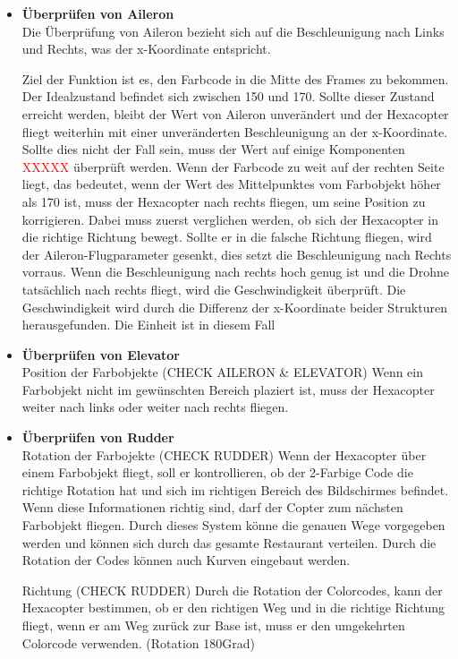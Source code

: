       \begin{itemize}
        \item \textbf{Überprüfen von Aileron}\\
        Die Überprüfung von Aileron bezieht sich auf die Beschleunigung nach Links und Rechts, was der x-Koordinate entspricht.

        Ziel der Funktion ist es, den Farbcode in die Mitte des Frames zu bekommen. Der Idealzustand befindet sich zwischen 150 und 170.
        Sollte dieser Zustand erreicht werden, bleibt der Wert von Aileron unverändert und der Hexacopter fliegt weiterhin mit einer unveränderten Beschleunigung an der
        x-Koordinate.
        Sollte dies nicht der Fall sein, muss der Wert auf einige Komponenten \textcolor{red}{XXXXX} überprüft werden.
        Wenn der Farbcode zu weit auf der rechten Seite liegt, das bedeutet, wenn der Wert des Mittelpunktes vom Farbobjekt höher als 170 ist,
        muss der Hexacopter nach rechts fliegen, um seine Position zu korrigieren.
        Dabei muss zuerst verglichen werden, ob sich der Hexacopter in die richtige Richtung bewegt. Sollte er in die falsche Richtung
        fliegen, wird der Aileron-Flugparameter gesenkt, dies setzt die Beschleunigung nach Rechts vorraus.
        Wenn die Beschleunigung nach rechts hoch genug ist und die Drohne tatsächlich nach rechts fliegt, wird die Geschwindigkeit überprüft.
        Die Geschwindigkeit wird durch die Differenz der x-Koordinate beider Strukturen herausgefunden. Die Einheit ist in diesem Fall



        \item \textbf{Überprüfen von Elevator}\\
        Position der Farbobjekte (CHECK AILERON \& ELEVATOR)
        Wenn ein Farbobjekt nicht im gewünschten Bereich plaziert ist, muss der Hexacopter weiter nach links oder weiter nach rechts fliegen.
        \item \textbf{Überprüfen von Rudder}\\
        Rotation der Farbojekte (CHECK RUDDER)
        Wenn der Hexacopter über einem Farbobjekt fliegt, soll er kontrollieren, ob der 2-Farbige Code die richtige Rotation hat und sich im richtigen Bereich des Bildschirmes befindet. Wenn diese Informationen richtig sind, darf der Copter zum nächsten Farbobjekt fliegen.
        Durch dieses System könne die genauen Wege vorgegeben werden und können sich durch das gesamte Restaurant verteilen. Durch die Rotation der Codes können auch Kurven eingebaut werden.

        Richtung (CHECK RUDDER)
        Durch die Rotation der Colorcodes, kann der Hexacopter bestimmen, ob er den richtigen Weg und in die richtige Richtung fliegt, wenn er am Weg zurück zur Base ist, muss er den umgekehrten Colorcode verwenden. (Rotation 180Grad)
      \end{itemize}

